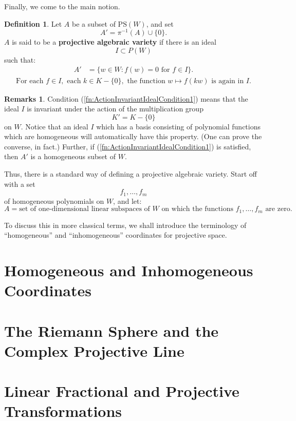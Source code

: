 \documentclass[12pt]{book}
\theoremstyle{plain}
\theoremstyle{definition}
\newtheorem{definition}{Definition}[section]
\newtheorem*{remarks}{Remarks}
\begin{document}
Finally, we come to the main notion.

\begin{definition}
    Let $A$ be a subset of $\textrm{PS}(W)$, and set
    $$A' = \pi^{-1}(A) \cup \{0\}.$$
    $A$ is said to be a \textbf{projective algebraic variety} if there is an ideal
    $$I \subset P(W)$$
    such that:
    \begin{align}
        A' &= \{w \in W: f(w) = 0 \text{ for } f \in I\}.
    \end{align}
    \begin{align} \label{fn:ActionInvariantIdealCondition1}
        \text{For each } f \in I, \text{ each } k \in K - \{0\}, \text{ the function } w \mapsto f(kw) \text{ is again in } I.
    \end{align}
\end{definition}

\begin{remarks}
    Condition (\ref{fn:ActionInvariantIdealCondition1}) means that the ideal $I$ is invariant under the action of the multiplication group
    $$K' = K - \{0\}$$
    on $W$.
    Notice that an ideal $I$ which has a basis consisting of polynomial functions which are homogeneous will automatically have this property.
    (One can prove the converse, in fact.)
    Further, if (\ref{fn:ActionInvariantIdealCondition1}) is satisfied, then $A'$ is a homogeneous subset of $W$.

    Thus, there is a standard way of defining a projective algebraic variety.
    Start off with a set
    $$f_1, \dots, f_m$$
    of homogeneous polynomials on $W$, and let:
    $$A = \text{set of one-dimensional linear subspaces of } W \text{ on which the functions } f_1, \dots, f_m \text{ are zero}.$$

    To discuss this in more classical terms, we shall introduce the terminology of ``homogeneous'' and ``inhomogeneous'' coordinates for projective space.
\end{remarks}

\section{Homogeneous and Inhomogeneous Coordinates}

\section{The Riemann Sphere and the Complex Projective Line}

\section{Linear Fractional and Projective Transformations}
\end{document}
